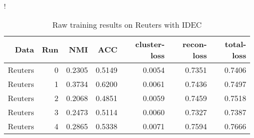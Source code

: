 \begin{table}[h]
\caption{Raw training results on Reuters with IDEC}\label{tab:idec-raw-Reuters}
\resizebox{\columnwidth}!{
\begin{tabular}{ | r | r | r | r | r | r | r |}
\hline
Data & Run & NMI & ACC & cluster-loss & recon-loss & total-loss  \\ \hline 
Reuters & 0 & 0.2305 & 0.5149 & 0.0054 & 0.7351 & 0.7406 \\ 
Reuters & 1 & 0.3734 & 0.6200 & 0.0061 & 0.7436 & 0.7497 \\ \hdashline 
Reuters & 2 & 0.2068 & 0.4851 & 0.0059 & 0.7459 & 0.7518 \\ 
Reuters & 3 & 0.2473 & 0.5114 & 0.0060 & 0.7327 & 0.7387 \\ \hdashline 
Reuters & 4 & 0.2865 & 0.5338 & 0.0071 & 0.7594 & 0.7666 \\ 
\hline
\end{tabular}
}
\end{table}